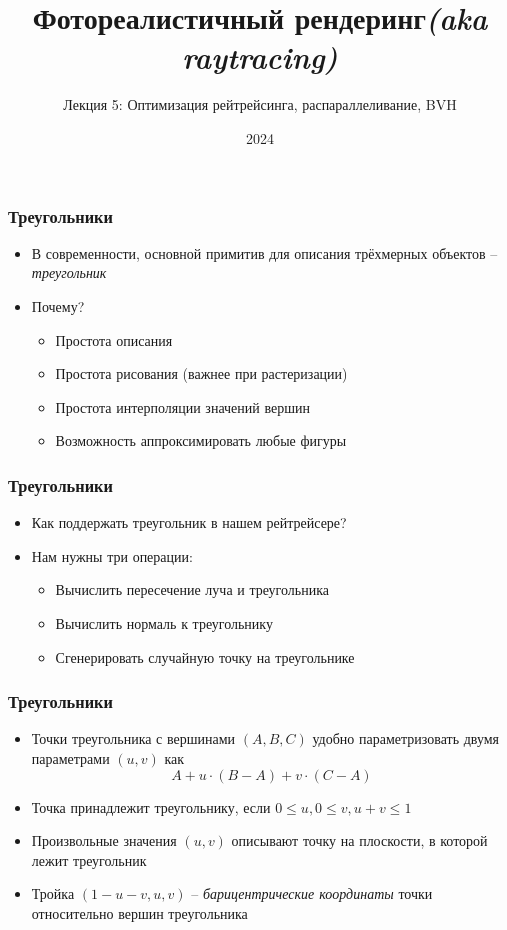 \documentclass[10pt]{beamer}
\title{Фотореалистичный рендеринг\quad\quad\quad\quad\quad\quad \textit{(aka raytracing)}}
\subtitle{Лекция 5: Оптимизация рейтрейсинга, распараллеливание, BVH}
\date{2024}
\begin{document}
\frame{\titlepage}

\begin{frame}
\frametitle{Треугольники}
\begin{itemize}
\item В современности, основной примитив для описания трёхмерных объектов -- \textit{треугольник}
\pause
\item Почему?
\pause
\begin{itemize}
\item Простота описания
\pause
\item Простота рисования (важнее при растеризации)
\pause
\item Простота интерполяции значений вершин
\pause
\item Возможность аппроксимировать любые фигуры
\end{itemize}
\end{itemize}
\end{frame}

\begin{frame}
\frametitle{Треугольники}
\begin{itemize}
\item Как поддержать треугольник в нашем рейтрейсере?
\pause
\item Нам нужны три операции:
\pause
\begin{itemize}
\item Вычислить пересечение луча и треугольника
\pause
\item Вычислить нормаль к треугольнику
\pause
\item Сгенерировать случайную точку на треугольнике
\end{itemize}
\end{itemize}
\end{frame}

\begin{frame}
\frametitle{Треугольники}
\begin{itemize}
\item Точки треугольника с вершинами \begin{math}(A,B,C)\end{math} удобно параметризовать двумя параметрами \begin{math}(u,v)\end{math} как
\begin{equation*}
A + u\cdot (B-A) + v\cdot (C-A)
\end{equation*}
\pause
\item Точка принадлежит треугольнику, если \begin{math}0 \leq u, 0 \leq v, u + v \leq 1\end{math}
\pause
\item Произвольные значения \begin{math}(u,v)\end{math} описывают точку на плоскости, в которой лежит треугольник
\pause
\item Тройка \begin{math}(1-u-v, u, v)\end{math} -- \textit{барицентрические координаты} точки относительно вершин треугольника
\end{itemize}
\end{frame}
\end{document}

